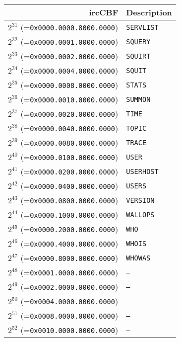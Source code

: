 \documentclass[documentation]{subfiles}
\begin{document}
\begin{minipage}{0.49\textwidth}
    \begin{longtable}{rl}
        \toprule
        {\bf ircCBF} & {\bf Description} \\
        \midrule\endhead%
        $2^{31}$ (={\tt 0x0000.0000.8000.0000}) & {\tt SERVLIST}\\
        $2^{32}$ (={\tt 0x0000.0001.0000.0000}) & {\tt SQUERY  }\\
        $2^{33}$ (={\tt 0x0000.0002.0000.0000}) & {\tt SQUIRT  }\\
        $2^{34}$ (={\tt 0x0000.0004.0000.0000}) & {\tt SQUIT   }\\
        $2^{35}$ (={\tt 0x0000.0008.0000.0000}) & {\tt STATS   }\\
        $2^{36}$ (={\tt 0x0000.0010.0000.0000}) & {\tt SUMMON  }\\
        $2^{37}$ (={\tt 0x0000.0020.0000.0000}) & {\tt TIME    }\\
        $2^{38}$ (={\tt 0x0000.0040.0000.0000}) & {\tt TOPIC   }\\
        $2^{39}$ (={\tt 0x0000.0080.0000.0000}) & {\tt TRACE   }\\
        $2^{40}$ (={\tt 0x0000.0100.0000.0000}) & {\tt USER    }\\
        $2^{41}$ (={\tt 0x0000.0200.0000.0000}) & {\tt USERHOST}\\
        $2^{42}$ (={\tt 0x0000.0400.0000.0000}) & {\tt USERS   }\\
        $2^{43}$ (={\tt 0x0000.0800.0000.0000}) & {\tt VERSION }\\
        $2^{44}$ (={\tt 0x0000.1000.0000.0000}) & {\tt WALLOPS }\\
        $2^{45}$ (={\tt 0x0000.2000.0000.0000}) & {\tt WHO     }\\
        $2^{46}$ (={\tt 0x0000.4000.0000.0000}) & {\tt WHOIS   }\\
        $2^{47}$ (={\tt 0x0000.8000.0000.0000}) & {\tt WHOWAS  }\\
        $2^{48}$ (={\tt 0x0001.0000.0000.0000}) & {\tt --      }\\
        $2^{49}$ (={\tt 0x0002.0000.0000.0000}) & {\tt --      }\\
        $2^{50}$ (={\tt 0x0004.0000.0000.0000}) & {\tt --      }\\
        $2^{51}$ (={\tt 0x0008.0000.0000.0000}) & {\tt --      }\\
        $2^{52}$ (={\tt 0x0010.0000.0000.0000}) & {\tt --      }\\

\end{longtable}
\end{minipage}
\end{document}
